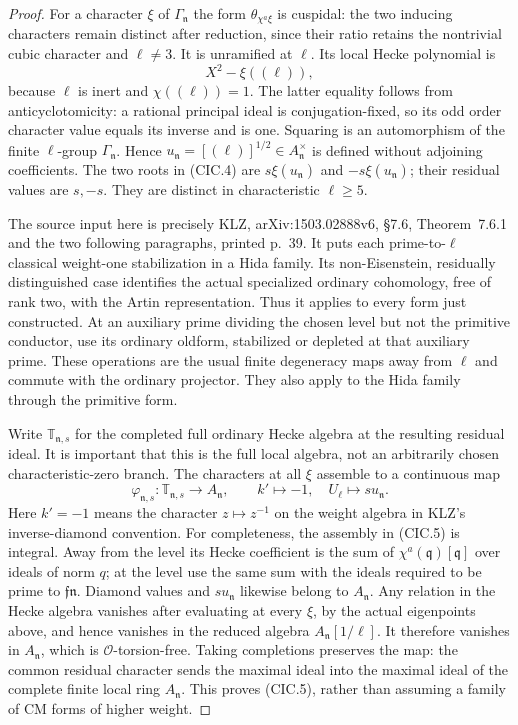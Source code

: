 \begin{proof}
For a character $\xi$ of $\Gamma_{\mathfrak n}$ the form
$\theta_{\chi^a\xi}$ is cuspidal: the two inducing characters
remain distinct after reduction, since their ratio retains
the nontrivial cubic character and $\ell\ne3$.
It is unramified at $\ell$.  Its local Hecke polynomial is
\[
        X^2-\xi((\ell)),                                \tag{CIC.4}
\]
because $\ell$ is inert and $\chi((\ell))=1$.
The latter equality follows from anticyclotomicity: a
rational principal ideal is conjugation-fixed, so its odd
order character value equals its inverse and is one.
Squaring is an automorphism of the finite $\ell$-group
$\Gamma_{\mathfrak n}$.  Hence
$u_{\mathfrak n}=[(\ell)]^{1/2}\in A_{\mathfrak n}^\times$
is defined without adjoining coefficients.  The two roots
in (CIC.4) are $s\xi(u_{\mathfrak n})$ and
$-s\xi(u_{\mathfrak n})$; their residual values are $s,-s$.
They are distinct in characteristic $\ell\ge5$.

The source input here is precisely KLZ,
arXiv:1503.02888v6, \S7.6, Theorem~7.6.1 and the two
following paragraphs, printed p.~39.  It puts each
prime-to-$\ell$ classical weight-one stabilization in a
Hida family.  Its non-Eisenstein, residually distinguished
case identifies the actual specialized ordinary cohomology,
free of rank two, with the Artin representation.  Thus it
applies to every form just constructed.  At an auxiliary
prime dividing the chosen level but not the primitive
conductor, use its ordinary oldform, stabilized or depleted
at that auxiliary prime.  These operations are the usual
finite degeneracy maps away from $\ell$ and commute with
the ordinary projector.  They also apply to the Hida family
through the primitive form.

Write $\mathbb T_{\mathfrak n,s}$ for the completed full
ordinary Hecke algebra at the resulting residual ideal.
It is important that this is the full local algebra, not
an arbitrarily chosen characteristic-zero branch.  The
characters at all $\xi$ assemble to a continuous map
\[
 \varphi_{\mathfrak n,s}:\mathbb T_{\mathfrak n,s}
                  \longrightarrow A_{\mathfrak n},
 \qquad k'\longmapsto-1,\quad U_\ell\longmapsto s u_{\mathfrak n}.
                                                        \tag{CIC.5}
\]
Here $k'=-1$ means the character $z\mapsto z^{-1}$ on the
weight algebra in KLZ's inverse-diamond convention.
For completeness, the assembly in (CIC.5) is integral.
Away from the level its Hecke coefficient is the sum of
$\chi^a(\mathfrak q)[\mathfrak q]$ over ideals of norm $q$;
at the level use the same sum with the ideals required to
be prime to $\mathfrak f\mathfrak n$.  Diamond values and
$s u_{\mathfrak n}$ likewise belong to $A_{\mathfrak n}$.
Any relation in the Hecke algebra vanishes after evaluating
at every $\xi$, by the actual eigenpoints above, and hence
vanishes in the reduced algebra $A_{\mathfrak n}[1/\ell]$.
It therefore vanishes in $A_{\mathfrak n}$, which is
$\mathcal O$-torsion-free.  Taking completions preserves
the map: the common residual character sends the maximal
ideal into the maximal ideal of the complete finite local
ring $A_{\mathfrak n}$.  This proves (CIC.5), rather than
assuming a family of CM forms of higher weight.


\end{proof}
